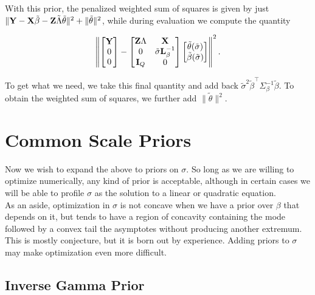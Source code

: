 \documentclass[10pt]{article}
\begin{document}
With this prior, the penalized weighted sum of squares is given by
just
$\|{\bf Y} - {\bf X}\tilde\beta - {\bf Z}\tilde\Lambda\tilde\theta\|^2 +
\|\tilde\theta\|^2$, while during evaluation we compute the quantity

\begin{equation*}
\left\|\begin{bmatrix}{\bf Y} \\ 0 \\ 0\end{bmatrix}
- 
\begin{bmatrix}
{\bf Z}\Lambda & {\bf X} \\
0 & \tilde\sigma {\bf L}_\beta^{-1} \\
{\bf I}_Q & 0
\end{bmatrix}
\begin{bmatrix}
\tilde\theta(\tilde\sigma) \\ \tilde\beta(\tilde\sigma)
\end{bmatrix} \right\|^2.
\end{equation*}

To get what we need, we take this final quantity and add back
$\tilde\sigma^2\tilde\beta^\top\Sigma_\beta^{-1}\tilde\beta$. To
obtain the weighted sum of squares, we further add $\|\tilde\theta\|^2$.

\newpage

\section*{Common Scale Priors}

Now we wish to expand the above to priors on $\sigma$. So long as we
are willing to optimize numerically, any kind of prior is acceptable,
although in certain cases we will be able to profile $\sigma$ as the
solution to a linear or quadratic equation. \\

As an aside, optimization in $\sigma$ is not concave when we have a
prior over $\beta$ that depends on it, but tends to have a region of concavity
containing the mode followed by a convex tail the asymptotes without
producing another extremum. This is mostly
conjecture, but it is born out by experience. Adding priors to
$\sigma$ may make optimization even more difficult.

\subsection*{Inverse Gamma Prior}
\end{document}
